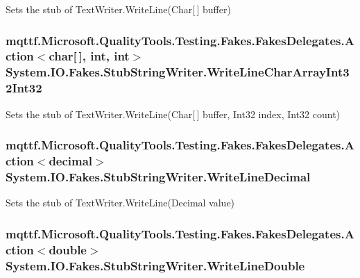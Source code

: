 Sets the stub of Text\-Writer.\-Write\-Line(\-Char\mbox{[}$\,$\mbox{]} buffer)

\hypertarget{class_system_1_1_i_o_1_1_fakes_1_1_stub_string_writer_ab92717a8d04a93badef863262338919e}{
\subsubsection[{Write\-Line\-Char\-Array\-Int32\-Int32}]{\setlength{\rightskip}{0pt plus 5cm}mqttf.\-Microsoft.\-Quality\-Tools.\-Testing.\-Fakes.\-Fakes\-Delegates.\-Action$<$char\mbox{[}$\,$\mbox{]}, int, int$>$ System.\-I\-O.\-Fakes.\-Stub\-String\-Writer.\-Write\-Line\-Char\-Array\-Int32\-Int32}}\label{class_system_1_1_i_o_1_1_fakes_1_1_stub_string_writer_ab92717a8d04a93badef863262338919e}


Sets the stub of Text\-Writer.\-Write\-Line(\-Char\mbox{[}$\,$\mbox{]} buffer, Int32 index, Int32 count)

\hypertarget{class_system_1_1_i_o_1_1_fakes_1_1_stub_string_writer_a1ef3fe2f80b2b1696712d556eabffd5e}{
\subsubsection[{Write\-Line\-Decimal}]{\setlength{\rightskip}{0pt plus 5cm}mqttf.\-Microsoft.\-Quality\-Tools.\-Testing.\-Fakes.\-Fakes\-Delegates.\-Action$<$decimal$>$ System.\-I\-O.\-Fakes.\-Stub\-String\-Writer.\-Write\-Line\-Decimal}}\label{class_system_1_1_i_o_1_1_fakes_1_1_stub_string_writer_a1ef3fe2f80b2b1696712d556eabffd5e}


Sets the stub of Text\-Writer.\-Write\-Line(\-Decimal value)

\hypertarget{class_system_1_1_i_o_1_1_fakes_1_1_stub_string_writer_ad60726f3f5aec5807eea481cf789a5f3}{
\subsubsection[{Write\-Line\-Double}]{\setlength{\rightskip}{0pt plus 5cm}mqttf.\-Microsoft.\-Quality\-Tools.\-Testing.\-Fakes.\-Fakes\-Delegates.\-Action$<$double$>$ System.\-I\-O.\-Fakes.\-Stub\-String\-Writer.\-Write\-Line\-Double}}\label{class_system_1_1_i_o_1_1_fakes_1_1_stub_string_writer_ad60726f3f5aec5807eea481cf789a5f3}



